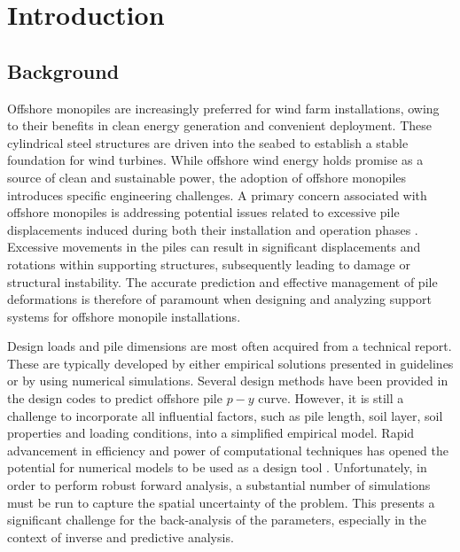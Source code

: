 \chapter{Introduction}
\label{intro}

\section{Background}

Offshore monopiles are increasingly preferred for wind farm installations, owing to their benefits in clean energy generation and convenient deployment. These cylindrical steel structures are driven into the seabed to establish a stable foundation for wind turbines. While offshore wind energy holds promise as a source of clean and sustainable power, the adoption of offshore monopiles introduces specific engineering challenges. A primary concern associated with offshore monopiles is addressing potential issues related to excessive pile displacements induced during both their installation and operation phases \citep{byrne2003,randolph2005}. Excessive movements in the piles can result in significant displacements and rotations within supporting structures, subsequently leading to damage or structural instability. The accurate prediction and effective management of pile deformations is therefore of paramount when designing and analyzing support systems for offshore monopile installations.





Design loads and pile dimensions are most often acquired from a technical report. These are typically developed by either empirical solutions presented in guidelines or by using numerical simulations. Several design methods have been provided in the design codes \citep{api2011,bhattacharya2019} to predict offshore pile $p-y$ curve. However, it is still a challenge to incorporate all influential factors, such as pile length, soil layer, soil properties and loading conditions, into a simplified empirical model. Rapid advancement in efficiency and power of computational techniques has opened the potential for numerical models to be used as a design tool \citep{randolph2017,taborda2020,zdravkovic2020,royston2022}. Unfortunately, in order to perform robust forward analysis, a substantial number of simulations must be run to capture the spatial uncertainty of the problem. This presents a significant challenge for the back-analysis of the parameters, especially in the context of inverse and predictive analysis.

